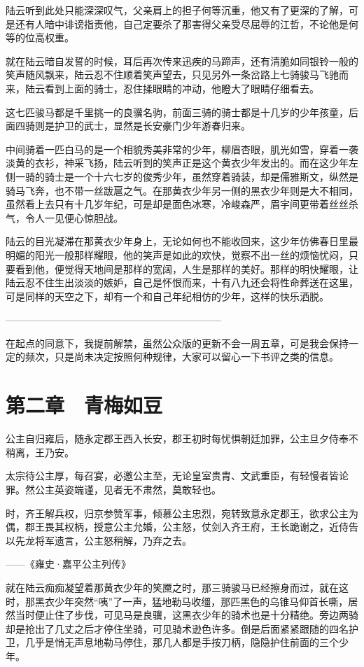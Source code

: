 陆云听到此处只能深深叹气，父亲肩上的担子何等沉重，他又有了更深的了解，可是还有人暗中诽谤指责他，自己定要杀了那害得父亲受尽屈辱的江哲，不论他是何等的位高权重。

就在陆云暗自发誓的时候，耳后再次传来迅疾的马蹄声，还有清脆如同银铃一般的笑声随风飘来，陆云忍不住顺着笑声望去，只见另外一条岔路上七骑骏马飞驰而来，陆云看到上面的骑士，忍住揉眼睛的冲动，他瞪大了眼睛仔细看去。

这七匹骏马都是千里挑一的良骥名驹，前面三骑的骑士都是十几岁的少年孩童，后面四骑则是护卫的武士，显然是长安豪门少年游春归来。

中间骑着一匹白马的是一个相貌秀美非常的少年，柳眉杏眼，肌光如雪，穿着一袭淡黄的衣衫，神采飞扬，陆云听到的笑声正是这个黄衣少年发出的。而在这少年左侧一骑的骑士是一个十六七岁的俊秀少年，虽然穿着骑装，却是儒雅斯文，纵然是骑马飞奔，也不带一丝跋扈之气。在那黄衣少年另一侧的黑衣少年则是大不相同，虽然看上去只有十几岁年纪，可是却是面色冰寒，冷峻森严，眉宇间更带着丝丝杀气，令人一见便心惊胆战。

陆云的目光凝滞在那黄衣少年身上，无论如何也不能收回来，这少年仿佛春日里最明媚的阳光一般那样耀眼，他的笑声是如此的欢快，觉察不出一丝的烦恼忧闷，只要看到他，便觉得天地间是那样的宽阔，人生是那样的美好。那样的明快耀眼，让陆云忍不住生出淡淡的嫉妒，自己是怀恨而来，十有八九还会将性命葬送在这里，可是同样的天空之下，却有一个和自己年纪相仿的少年，这样的快乐洒脱。

——————————————————————

在起点的同意下，我提前解禁，虽然公众版的更新不会一周五章，可是我会保持一定的频次，只是尚未决定按照何种规律，大家可以留心一下书评之类的信息。

\chapter{第二章　青梅如豆}

公主自归雍后，随永定郡王西入长安，郡王初时每忧惧朝廷加罪，公主旦夕侍奉不稍离，王乃安。

太宗待公主厚，每召宴，必邀公主至，无论皇室贵胄、文武重臣，有轻慢者皆论罪。然公主英姿端谨，见者无不肃然，莫敢轻也。

时，齐王解兵权，归京参赞军事，倾慕公主忠烈，宛转致意永定郡王，欲求公主为偶，郡王畏其权柄，授意公主允婚，公主怒，仗剑入齐王府，王长跪谢之，近侍告以先龙将军遗言，公主怒稍解，乃弃之去。

——《雍史·嘉平公主列传》

就在陆云痴痴凝望着那黄衣少年的笑黡之时，那三骑骏马已经擦身而过，就在这时，那黑衣少年突然“咦”了一声，猛地勒马收缰，那匹黑色的乌锥马仰首长嘶，居然当时便止住了步伐，可见马是良骥，这黑衣少年的骑术也是十分精绝。旁边两骑却是抢出了几丈之后才停住坐骑，可见骑术逊色许多。倒是后面紧紧跟随的四名护卫，几乎是悄无声息地勒马停住，那几人都是手按刀柄，隐隐护住前面的三个少年。

